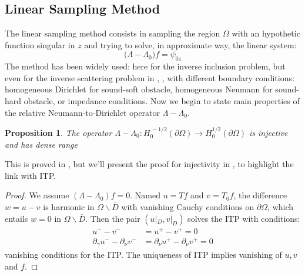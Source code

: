 \documentclass[10pt, a4paper, twoside, openright]{book}
\theoremstyle{definition}
\theoremstyle{plain}
\theoremstyle{plain}
\theoremstyle{plain}
\newtheorem{proposition}[subsection]{Proposition}
\theoremstyle{plain}
\theoremstyle{plain}
\theoremstyle{plain}
\theoremstyle{plain}
\theoremstyle{plain}
\begin{document}
\subsection{Linear Sampling Method}
 The linear sampling method consists in sampling the region $\Omega$ with an hypothetic function singular in $z$ and trying to solve, in approximate way, the linear system:
 \begin{equation}
  \bigl(\Lambda - \Lambda_0\bigr)f=\psi_{0z}
 \end{equation}
 The method has been widely used: here for the inverse inclusion problem, but even for the inverse scattering problem in \cite{cakoni-colton-haddar:lsm}, \cite{colton-haddar-piana:lsm}, with different boundary conditions: homogeneous Dirichlet for sound-soft obstacle, homogeneous Neumann for sound-hard obstacle, or impedance conditions.
 Now we begin to state main properties of the relative Neumann-to-Dirichlet operator $\Lambda - \Lambda_0$.
 \begin{proposition}
  The operator $\Lambda - \Lambda_0:H_0^{\,-1/2}(\partial \Omega)\to H_0^{1/2}(\partial \Omega)$ is injective and has dense range
 \end{proposition}
 This is proved in \cite{kirsch:book}, but we'll present the proof for injectivity in \cite{somersalo:preprint}, to highlight the link with ITP.
 \begin{proof}
 We assume $(\Lambda - \Lambda_0)f = 0$. Named $u=Tf$ and $v=T_0f$, the difference $w=u-v$ is harmonic in $\Omega\backslash\overline{D}$ with vanishing Cauchy conditions on $\partial \Omega$, which entails $w=0$ in $\Omega\backslash\overline{D}$. Then the pair $(u|_D,v|_D)$ solves the ITP with conditions:
 \begin{align}
  u^--v^- &=u^+ - v^+ = 0 \\
  \partial_\gamma u^- - \partial_\nu v^- &= \partial_\nu u^+ - \partial_\nu v^+ = 0 
 \end{align}
 vanishing conditions for the ITP. The uniqueness of ITP implies vanishing of $u,v$ and $f$. 
 \end{proof}
\end{document}
